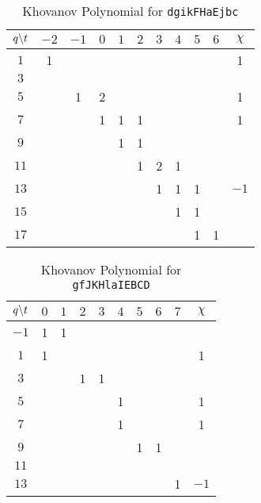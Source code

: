 \begin{table}
    \centering
    \begin{tabular}{| c | c | c | c | c | c | c | c | c | c | c |}
        \hline
        $q\symbol{92}t$&$-2$&$-1$&$0$&$1$&$2$&$3$&$4$&$5$&$6$&$\chi$\\
        \hline
        $1$&1&&&&&&&&&1\\
        \hline
        $3$&&&&&&&&&&\\
        \hline
        $5$&&1&2&&&&&&&1\\
        \hline
        $7$&&&1&1&1&&&&&1\\
        \hline
        $9$&&&&1&1&&&&&\\
        \hline
        $11$&&&&&1&2&1&&&\\
        \hline
        $13$&&&&&&1&1&1&&$-1$\\
        \hline
        $15$&&&&&&&1&1&&\\
        \hline
        $17$&&&&&&&&1&1&\\
        \hline
    \end{tabular}
    \caption{Khovanov Polynomial for \texttt{dgikFHaEjbc}}
    \label{table:dgikFHaEjbc_kho}
\end{table}
\begin{table}
    \centering
    \begin{tabular}{| c | c | c | c | c | c | c | c | c | c |}
        \hline
        $q\symbol{92}t$&$0$&$1$&$2$&$3$&$4$&$5$&$6$&$7$&$\chi$\\
        \hline
        $-1$&1&1&&&&&&&\\
        \hline
        $1$&1&&&&&&&&1\\
        \hline
        $3$&&&1&1&&&&&\\
        \hline
        $5$&&&&&1&&&&1\\
        \hline
        $7$&&&&&1&&&&1\\
        \hline
        $9$&&&&&&1&1&&\\
        \hline
        $11$&&&&&&&&&\\
        \hline
        $13$&&&&&&&&1&$-1$\\
        \hline
    \end{tabular}
    \caption{Khovanov Polynomial for \texttt{gfJKHlaIEBCD}}
    \label{table:gfJKHlaIEBCD_kho}
\end{table}
